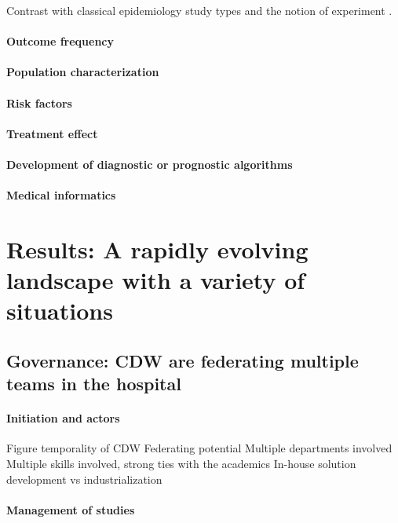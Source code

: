 \documentclass{report}
\begin{document}
Contrast with classical epidemiology study types and the notion of experiment \citep{rothman2012epidemiology}.

\paragraph{Outcome frequency}
\paragraph{Population characterization}
\paragraph{Risk factors}
\paragraph{Treatment effect}
\paragraph{Development of diagnostic or prognostic algorithms}
\paragraph{Medical informatics}


\section{Results: A rapidly evolving landscape with a variety of
  situations}\label{sec:cdw:results}

\subsection{Governance: CDW are federating multiple teams in the
  hospital}\label{subsec:cdw:results:governance}
\paragraph{Initiation and actors}
Figure temporality of CDW
Federating potential
Multiple departments involved
Multiple skills involved, strong ties with the academics
In-house solution development vs industrialization

\paragraph{Management of studies}
\end{document}
